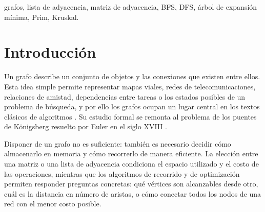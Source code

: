 \documentclass[conference]{IEEEtran}
\def\abstractname{Abstract}}
\begin{document}
\def\abstractname{Resumen}
\def\IEEEkeywordsname{Palabras clave}
\begin{abstract}
Los grafos son una de las estructuras de datos más versátiles de las ciencias de la computación, pues permiten modelar relaciones entre entidades como carreteras, computadoras, personas o módulos de software. Este trabajo presenta un estudio de la teoría de grafos y de cuatro algoritmos fundamentales: recorrido en anchura (BFS), recorrido en profundidad (DFS), algoritmo de Prim y algoritmo de Kruskal. Se expone la definición formal de grafo, se comparan las representaciones por matriz y por lista de adyacencia sobre un mismo grafo base ponderado de siete vértices, y se analiza cada algoritmo mediante pseudocódigo, trazas paso a paso y complejidad temporal expresada en función del número de vértices $V$ y de aristas $E$. Todos los algoritmos se implementaron en Java 17 y se validaron con pruebas, incluidos 300 grafos aleatorios. En el grafo base, Prim y Kruskal producen el mismo árbol de expansión mínima, de costo total 30, y los órdenes de recorrido coinciden con las trazas realizadas a mano.
\end{abstract}

\begin{IEEEkeywords}
grafos, lista de adyacencia, matriz de adyacencia, BFS, DFS, árbol de expansión mínima, Prim, Kruskal.
\end{IEEEkeywords}

\section{Introducción}
Un grafo describe un conjunto de objetos y las conexiones que existen entre ellos. Esta idea simple permite representar mapas viales, redes de telecomunicaciones, relaciones de amistad, dependencias entre tareas o los estados posibles de un problema de búsqueda, y por ello los grafos ocupan un lugar central en los textos clásicos de algoritmos \cite{clrs,sedgewick}. Su estudio formal se remonta al problema de los puentes de Königsberg resuelto por Euler en el siglo XVIII \cite{euler}.

Disponer de un grafo no es suficiente: también es necesario decidir cómo almacenarlo en memoria y cómo recorrerlo de manera eficiente. La elección entre una matriz o una lista de adyacencia condiciona el espacio utilizado y el costo de las operaciones, mientras que los algoritmos de recorrido y de optimización permiten responder preguntas concretas: qué vértices son alcanzables desde otro, cuál es la distancia en número de aristas, o cómo conectar todos los nodos de una red con el menor costo posible.
\end{document}
